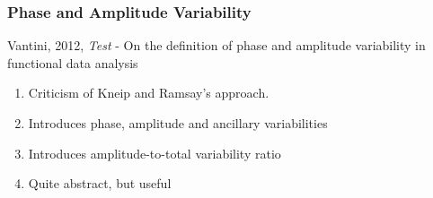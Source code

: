 \documentclass[10pt,dvipsnames,table]{beamer}
\begin{document}
\begin{frame}
\frametitle{Phase and Amplitude Variability}
Vantini, 2012, {\emph{Test}} - On the definition of phase and amplitude variability in functional data analysis
\begin{enumerate}
\item Criticism of Kneip and Ramsay's approach. 
\item Introduces phase, amplitude and ancillary variabilities
\item Introduces amplitude-to-total variability ratio
\item Quite abstract, but useful
\end{enumerate}
\end{frame}
\end{document}

